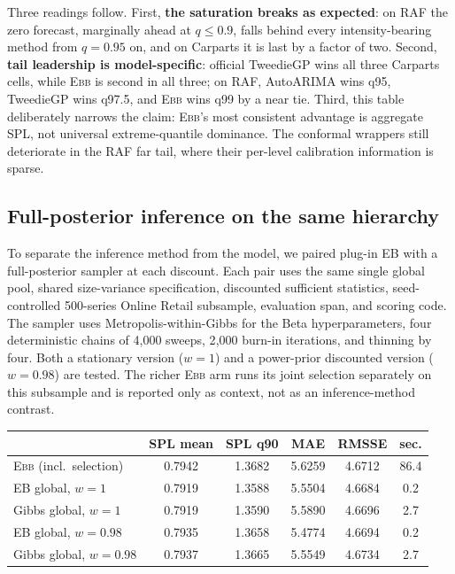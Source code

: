 \documentclass[twoside]{article}
\theoremstyle{definition}
\newcommand{\EBB}{\textsc{Ebb}}
\begin{document}
Three readings follow. First, \textbf{the saturation breaks as expected}:
on RAF the zero forecast, marginally ahead at $q\le0.9$, falls behind
every intensity-bearing method from $q{=}0.95$ on, and on Carparts it is
last by a factor of two. Second, \textbf{tail leadership is
model-specific}: official TweedieGP wins all three Carparts cells, while
\EBB{} is second in all three; on RAF, AutoARIMA wins q95, TweedieGP
wins q97.5, and \EBB{} wins q99 by a near tie. Third, this table
deliberately narrows the claim: \EBB{}'s most consistent advantage is
aggregate SPL, not universal extreme-quantile dominance. The conformal
wrappers still deteriorate in the RAF far tail, where their per-level
calibration information is sparse.

\subsection{Full-posterior inference on the same hierarchy}
\label{app:mcmc}

To separate the inference method from the model, we paired plug-in EB
with a full-posterior sampler at each discount. Each pair uses the same
single global pool, shared size-variance specification, discounted
sufficient statistics, seed-controlled 500-series Online Retail subsample,
evaluation span, and scoring code. The sampler uses
Metropolis-within-Gibbs for the Beta hyperparameters, four deterministic
chains of 4{,}000 sweeps, 2{,}000 burn-in iterations, and thinning by four.
Both a stationary version ($w{=}1$) and a power-prior discounted version
($w{=}0.98$) are tested. The richer \EBB{} arm runs its joint
selection separately on this subsample and is
reported only as context, not as an inference-method contrast.

\begin{table}[h]
\centering
\small
\begin{tabular}{lccccc}
\toprule
 & SPL mean & SPL q90 & MAE & RMSSE & sec.\\
\midrule
\EBB{} (incl.\ selection) & 0.7942 & 1.3682 & 5.6259 & 4.6712 & 86.4\\
EB global, $w{=}1$ & 0.7919 & 1.3588 & 5.5504 & 4.6684 & 0.2\\
Gibbs global, $w{=}1$ & 0.7919 & 1.3590 & 5.5890 & 4.6696 & 2.7\\
EB global, $w{=}0.98$ & 0.7935 & 1.3658 & 5.4774 & 4.6694 & 0.2\\
Gibbs global, $w{=}0.98$ & 0.7937 & 1.3665 & 5.5549 & 4.6734 & 2.7\\
\bottomrule
\end{tabular}
\end{table}
\end{document}
